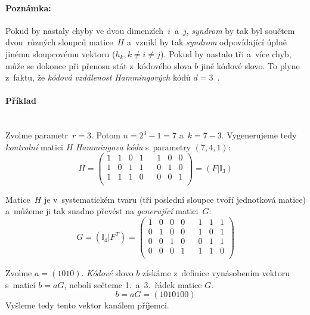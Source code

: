 \documentclass[thesis=M,czech,hidelinks]{FITthesis}[2012/06/26]
\newcommand{\0}{{\textcolor[gray]{0.75}{0}}}
\begin{document}
\paragraph{Poznámka:} Pokud by nastaly chyby ve dvou dimenzích~$i$~a~$j$,
\emph{syndrom} by tak byl součtem dvou~různých sloupců matice~$H$ a~vznikl by
tak \emph{syndrom} odpovídající úplně jinému sloupcovému vektoru
($h_k, k \neq i \neq j$). Pokud by nastalo tři a~více chyb, může se dokonce při
přenosu stát z~kódového slova $b$ jiné kódové slovo. To plyne z~faktu, že
\emph{kódová vzdálenost} \emph{Hammingových} kódů $d=3$~\cite{Adamek}.

\paragraph{Příklad} \hfill \\
Zvolme parametr~$r = 3$. Potom $n = 2^3 - 1 = 7$ a~$k = 7-3$. Vygenerujeme tedy
\emph{kontrolní} matici $H$ \emph{Hammingova kódu} s~parametry $(7,4,1)$:
$$
    H = \left(
    \begin{array}{*{8}{c}}
        1 & 1 & 0 & 1 & & 1 & 0 & 0 \\
        1 & 0 & 1 & 1 & & 0 & 1 & 0 \\
        1 & 1 & 1 & 0 & & 0 & 0 & 1 \\
    \end{array}
    \right) = \left( F | \mathbb{I}_3 \right)
$$

Matice~$H$ je v~systematickém tvaru (tři poslední sloupce tvoří jednotková
matice) a~můžeme ji tak snadno převést na \emph{generující} matici~$G$:
$$
    G = \left( \mathbb{I}_4 | F^T \right) = \left(
    \begin{array}{*{8}{c}}
        1 & 0 & 0 & 0 & & 1 & 1 & 1 \\
        0 & 1 & 0 & 0 & & 1 & 0 & 1 \\
        0 & 0 & 1 & 0 & & 0 & 1 & 1 \\
        0 & 0 & 0 & 1 & & 1 & 1 & 0 \\
    \end{array}
    \right)
$$

Zvolme $a=(1010)$. \emph{Kódové} slovo $b$ získáme z~definice vynásobením
vektoru s~maticí $b = aG$, neboli sečteme 1.~a~3.~řádek matice $G$.
$$ b = aG = (1010100) $$
Vyšleme tedy tento vektor kanálem příjemci.
\end{document}
